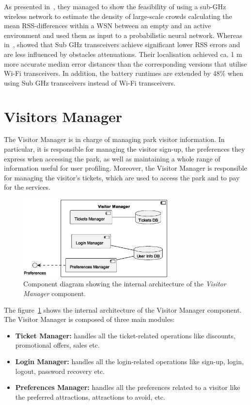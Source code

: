 As presented in~\cite{denis2018large}, they managed to show the feasibility of using a sub-GHz wireless network to estimate the
density of large-scale crowds calculating the mean RSS-differences within a WSN between an empty and an active environment and used them
as input to a probabilistic neural network.
Whereas in~\cite{fudickar2014comparing}, showed that Sub GHz transceivers achieve significant lower RSS errors and are less influenced by obstacles attenuations.
Their localisation achieved ca. 1 m more accurate median error distances than the corresponding versions that utilise Wi-Fi transceivers.
In addition, the battery runtimes are extended by 48\% when using Sub GHz transceivers instead of Wi-Fi transceivers.


\section{Visitors Manager}

The Visitor Manager is in charge of managing park visitor information. In particular, it is responsible for managing the visitor sign-up, the
preferences they express when accessing the park, as well as maintaining a whole range of information useful for user profiling.
Moreover, the Visitor Manager is responsible for managing the visitor's tickets, which are used to access the park and to pay for the services.

\begin{figure}[H]
	\centering
	\includegraphics[width=0.7\textwidth]{img/visitor-manager.eps}
	\caption{Component diagram showing the internal architecture of the \textit{Visitor Manager} component.
	}
	\label{fig:visitor-manager-arch}
\end{figure}

The figure~\ref{fig:visitor-manager-arch} shows the internal architecture of the Visitor Manager component. The Visitor Manager is composed of three main modules:

\begin{itemize}
	\item \textbf{Ticket Manager:} handles all the ticket-related operations like discounts, promotional offers, sales etc.
	\item \textbf{Login Manager:} handles all the login-related operations like sign-up, login, logout, password recovery etc.
	\item \textbf{Preferences Manager:} handles all the preferences related to a visitor like the preferred attractions, attractions to avoid, etc.
\end{itemize}

